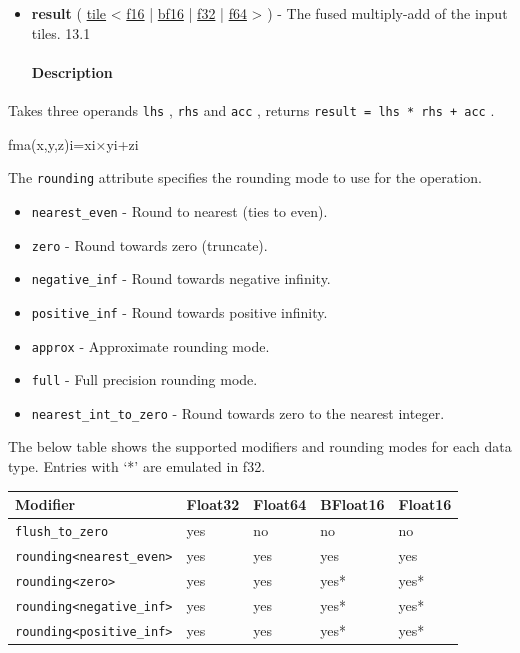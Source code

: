 \documentclass{article}
\begin{document}
\begin{itemize}
\paragraph{Results}

\item \textbf{result} ( \href{https://docs.nvidia.com/cuda/tile-ir/latest/sections/types.html#type-tile}{tile} < \href{https://docs.nvidia.com/cuda/tile-ir/latest/sections/types.html#subsection-element-types}{f16} | \href{https://docs.nvidia.com/cuda/tile-ir/latest/sections/types.html#subsection-element-types}{bf16} | \href{https://docs.nvidia.com/cuda/tile-ir/latest/sections/types.html#subsection-element-types}{f32} | \href{https://docs.nvidia.com/cuda/tile-ir/latest/sections/types.html#subsection-element-types}{f64} > ) - The fused multiply-add of the input tiles. 13.1


\paragraph{Description}

\end{itemize}
Takes three operands \texttt{lhs} , \texttt{rhs} and \texttt{acc} , returns \texttt{result = lhs * rhs + acc} .


fma(x,y,z)i=xi×yi+zi

The \texttt{rounding} attribute specifies the rounding mode to use for the operation.


\begin{itemize}
\item \texttt{nearest\_even} - Round to nearest (ties to even).
\item \texttt{zero} - Round towards zero (truncate).
\item \texttt{negative\_inf} - Round towards negative infinity.
\item \texttt{positive\_inf} - Round towards positive infinity.
\item \texttt{approx} - Approximate rounding mode.
\item \texttt{full} - Full precision rounding mode.
\item \texttt{nearest\_int\_to\_zero} - Round towards zero to the nearest integer.

\end{itemize}
The below table shows the supported modifiers and rounding modes for each data type. Entries with `*' are emulated in f32.


\begin{longtable}{l|l|l|l|l}
\hline
Modifier & Float32 & Float64 & BFloat16 & Float16 \\ \hline
\texttt{flush\_to\_zero} & yes & no & no & no \\ \hline
\texttt{rounding<nearest\_even>} & yes & yes & yes & yes \\ \hline
\texttt{rounding<zero>} & yes & yes & yes* & yes* \\ \hline
\texttt{rounding<negative\_inf>} & yes & yes & yes* & yes* \\ \hline
\texttt{rounding<positive\_inf>} & yes & yes & yes* & yes* \\ \hline
\end{longtable}
\end{document}
